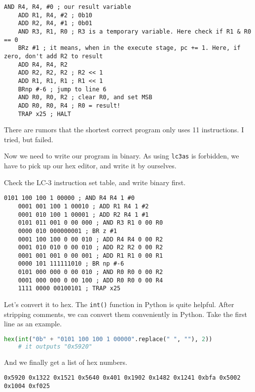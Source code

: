 \documentclass{article}
\begin{document}
	\begin{lstlisting}[caption={Final ``pseudo-assembly" program},captionpos=b]
	AND R4, R4, #0 ; our result variable
	ADD R1, R4, #2 ; 0b10
	ADD R2, R4, #1 ; 0b01
	AND R3, R1, R0 ; R3 is a temporary variable. Here check if R1 & R0 == 0
	BRz #1 ; it means, when in the execute stage, pc += 1. Here, if zero, don't add R2 to result
	ADD R4, R4, R2
	ADD R2, R2, R2 ; R2 << 1
	ADD R1, R1, R1 ; R1 << 1
	BRnp #-6 ; jump to line 6
	AND R0, R0, R2 ; clear R0, and set MSB
	ADD R0, R0, R4 ; R0 = result!
	TRAP x25 ; HALT
	\end{lstlisting}
	
	There are rumors that the shortest correct program only uses 11 instructions. I tried, but failed.
	
	Now we need to write our program in binary. As using \texttt{lc3as} is forbidden, we have to pick up our hex editor, and write it by ourselves.
	
	Check the LC-3 instruction set table, and write binary first.
	
	\begin{lstlisting}[caption={Binary},captionpos=b]
	0101 100 100 1 00000 ; AND R4 R4 1 #0
	0001 001 100 1 00010 ; ADD R1 R4 1 #2
	0001 010 100 1 00001 ; ADD R2 R4 1 #1
	0101 011 001 0 00 000 ; AND R3 R1 0 00 R0
	0000 010 000000001 ; BR z #1
	0001 100 100 0 00 010 ; ADD R4 R4 0 00 R2
	0001 010 010 0 00 010 ; ADD R2 R2 0 00 R2
	0001 001 001 0 00 001 ; ADD R1 R1 0 00 R1
	0000 101 111111010 ; BR np #-6
	0101 000 000 0 00 010 ; AND R0 R0 0 00 R2
	0001 000 000 0 00 100 ; ADD R0 R0 0 00 R4
	1111 0000 00100101 ; TRAP x25
	\end{lstlisting}
	
	Let's convert it to hex. The \texttt{int()} function in Python is quite helpful. After stripping comments, we can convert them conveniently in Python. Take the first line as an example.
	
	\begin{lstlisting}[language=Python, caption={Converting from binary to hex},captionpos=b]
	hex(int("0b" + "0101 100 100 1 00000".replace(" ", ""), 2))
	# it outputs "0x5920"
	\end{lstlisting}
	
	And we finally get a list of hex numbers.
	
	\begin{lstlisting}[caption={The hex numbers},captionpos=b]
	0x5920 0x1322 0x1521 0x5640 0x401 0x1902 0x1482 0x1241 0xbfa 0x5002 0x1004 0xf025
	\end{lstlisting}
	
\end{document}
